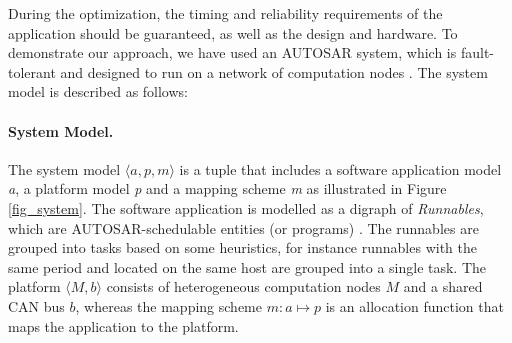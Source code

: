 During the optimization, the timing and reliability requirements of the application should be guaranteed, as well as the design and hardware. To demonstrate our approach, we have used an AUTOSAR system, which is fault-tolerant and designed to run on a network of computation nodes \cite{Mahmud5222}. The system model is described as follows:

\paragraph{System Model. } The system model $\langle a, p, m \rangle$ is a tuple that includes a software application model \textit{a}, a platform model \textit{p} and a mapping scheme \textit{m} as illustrated in Figure \ref{fig_system}. The software application is modelled as a digraph of \textit{Runnables}, which are AUTOSAR-schedulable entities (or programs) \cite{NaumannAUTOSARBus}. The runnables are grouped into tasks based on some heuristics, for instance runnables with the same period and located on the same host are grouped into a single task. The platform $\langle M, b\rangle$ consists of heterogeneous computation nodes $M$ and a shared CAN bus $b$, whereas the mapping scheme $m:a\mapsto p$ is an allocation function that maps the application to the platform.

